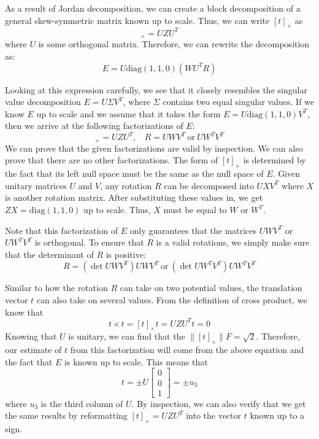 \documentclass[a4paper, 12pt]{article}
\numberwithin{equation}{section}
\begin{document}
As a result of Jordan decomposition, we can create a block decomposition of a general skew-symmetric matrix known up to scale. Thus, we can write $[t]_\times$ as 
\begin{equation}
    [t]_\times  = UZU^T
\end{equation}
where $U$ is some orthogonal matrix. Therefore, we can rewrite the decomposition as:
\begin{equation}
    E = U\mathrm{diag}(1,1,0)  (WU^TR)
\end{equation}

Looking at this expression carefully, we see that it closely resembles the singular value decomposition $E = U\Sigma V^T$, where $\Sigma$ contains two equal singular values. If we know $E$ up to scale and we assume that it takes the form $E = U \mathrm{diag}(1,1,0)V^T$, then we arrive at the following factorizations of $E$:
\begin{equation}
    [t]_\times  = UZU^T, ~~~~ R= UWV^T ~ \mathrm{or} ~ UW^TV^T
\end{equation}
We can prove that the given factorizations are valid by inspection. We can also prove that there are no other factorizations. The form of $[t]_\times$ is determined by the fact that its left null space must be the same as the null space of $E$. Given unitary matrices $U$ and $V$, any rotation $R$ can be decomposed into $UXV^T$ where $X$ is another rotation matrix. After substituting these values in, we get $ZX = \mathrm{diag}(1,1,0)$ up to scale. Thus, $X$ must be equal to $W$ or $W^T$. 

Note that this factorization of $E$ only guarantees that the matrices $UWV^T$ or $UW^TV^T$ is orthogonal. To ensure that $R$ is a valid rotations, we simply make sure that the determinant of $R$ is positive:
\begin{equation}
    R= (\det UWV^T)UWV^T ~ \mathrm{or} ~ (\det UW^TV^T)UW^TV^T
\end{equation}

Similar to how the rotation $R$ can take on two potential values, the translation vector $t$ can also take on several values. From the definition of cross product, we know that
\begin{equation}
    t \times t = [t]_\times t = UZU^T t = 0
\end{equation}
Knowing that $U$ is unitary, we can find that the $\|[t]_\times\|F = \sqrt{2}$. Therefore, our estimate of $t$ from this factorization will come from the above equation and the fact that $E$ is known up to scale. This means that 
\begin{equation}
    t = \pm U\begin{bmatrix}0\\0\\1\end{bmatrix} = \pm u_3
\end{equation}
where $u_3$ is the third column of $U$. By inspection, we can also verify that we get the same results by reformatting $[t]_\times = UZU^T$ into the vector $t$ known up to a sign.
\end{document}
